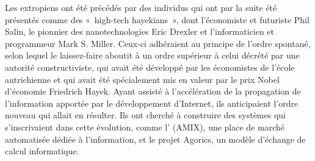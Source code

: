 Les extropiens ont été précédés par des individus qui ont par la suite été présentés comme des «~high-tech hayekians~», dont l'économiste et futuriste Phil Salin, le pionnier des nanotechnologies Eric Drexler et l'informaticien et programmeur Mark S. Miller. Ceux-ci adhéraient au principe de l'ordre spontané, selon lequel le laissez-faire aboutit à un ordre supérieur à celui décrété par une autorité constructiviste, qui avait été développé par les économistes de l'école autrichienne et qui avait été spécialement mis en valeur par le prix Nobel d'économie Friedrich Hayek. Ayant assisté à l'accélération de la propagation de l'information apportée par le développement d'Internet, ils anticipaient l'ordre nouveau qui allait en résulter. Ils ont cherché à construire des systèmes qui s'inscrivaient dans cette évolution, comme l' (AMIX), une place de marché automatisée dédiée à l'information, et le projet Agorics, un modèle d'échange de calcul informatique.

